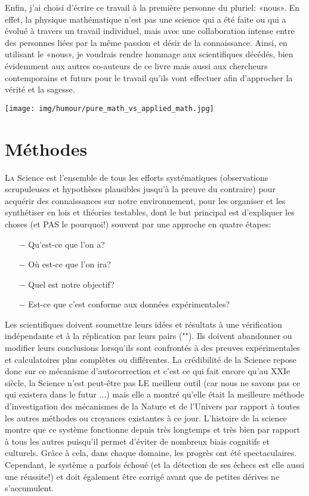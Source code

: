 	Enfin, j'ai choisi d'\'ecrire ce travail à la première personne du pluriel: «nous». En effet, la physique math\'ematique n'est pas une science qui a \'et\'e faite ou qui a \'evolu\'e à travers un travail individuel, mais avec une collaboration intense entre des personnes li\'ees par la même passion et d\'esir de la connaissance. Ainsi, en utilisant le «nous», je voudrais rendre hommage aux scientifiques d\'ec\'ed\'es, bien \'evidemment aux autres co-auteurs de ce livre mais aussi aux chercheurs contemporains et futurs pour le travail qu'ils vont effectuer afin d'approcher la v\'erit\'e et la sagesse.
	
	\begin{center}
	\texttt{[image: img/humour/pure\_math\_vs\_applied\_math.jpg]}
	\end{center}

	\newpage
	\thispagestyle{empty}
	\mbox{}
	\section{M\'ethodes}	
	\lettrine[lines=4]{\color{BrickRed}L}a Science est l'ensemble de tous les efforts syst\'ematiques (observations scrupuleuses et hypothèses plausibles jusqu'à la preuve du contraire) pour acqu\'erir des connaissances sur notre environnement, pour les organiser et les synth\'etiser en lois et th\'eories testables, dont le but principal est d'expliquer les choses (et PAS le pourquoi!) souvent par une approche en quatre \'etapes:
	
	\begin{itemize}
		\item[$-$] Qu'est-ce que l'on a?
		\item[$-$] Où est-ce que l'on ira?
		\item[$-$] Quel est notre objectif?	
		\item[$-$] Est-ce que c'est conforme aux donn\'ees exp\'erimentales?
	\end{itemize}
	
	Les scientifiques doivent soumettre leurs id\'ees et r\'esultats à une v\'erification ind\'ependante et à la r\'eplication par leurs pairs (""). Ils doivent abandonner ou modifier leurs conclusions lorsqu'ils sont confront\'es à des preuves exp\'erimentales et calculatoires plus complètes ou diff\'erentes. La cr\'edibilit\'e de la Science repose donc sur ce m\'ecanisme d'autocorrection et c'est ce qui fait encore qu'au XXIe siècle, la Science n'est peut-être pas LE meilleur outil (car nous ne savons pas ce qui existera dans le futur ...) mais elle a montré qu'elle était la meilleure m\'ethode d'investigation des mécanismes de la Nature et de l'Univers par rapport à toutes les autres m\'ethodes ou croyances existantes à ce jour. L'histoire de la science montre que ce système fonctionne depuis très longtemps et très bien par rapport à tous les autres puisqu'il permet d'\'eviter de nombreux biais cognitifs et culturels. Grâce à cela, dans chaque domaine, les progrès ont \'et\'e spectaculaires. Cependant, le système a parfois \'echou\'e (et la d\'etection de ses \'echecs est elle aussi une r\'eussite!) et doit \'egalement être corrig\'e avant que de petites d\'erives ne s'accumulent.

